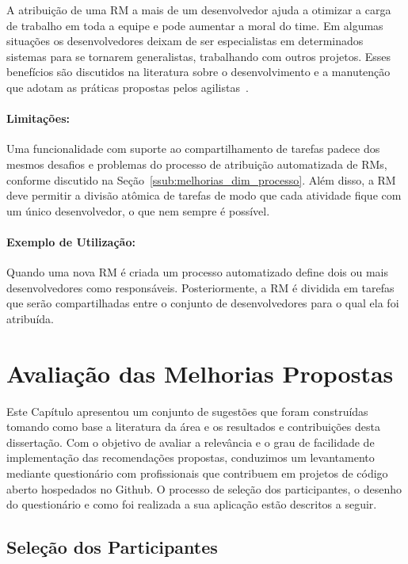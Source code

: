 A atribuição de uma RM a mais de um desenvolvedor ajuda a otimizar a carga de
trabalho em toda a equipe e pode aumentar a moral do time. Em algumas situações
os desenvolvedores deixam de ser especialistas em determinados sistemas para se
tornarem generalistas, trabalhando com outros projetos. Esses benefícios são
discutidos na literatura sobre o desenvolvimento e a manutenção que adotam as
práticas propostas pelos agilistas~\cite{dybaa2008empirical,rudzki2009agile}.

\paragraph{Limitações:}
\label{par:limitacoes_s08}

Uma funcionalidade com suporte ao compartilhamento de tarefas padece dos mesmos
desafios e problemas do processo de atribuição automatizada de RMs, conforme
discutido na Seção~\ref{ssub:melhorias_dim_processo}. Além disso, a RM deve
permitir a divisão atômica de tarefas de modo que cada atividade fique com um
único desenvolvedor, o que nem sempre é possível.

\paragraph{Exemplo de Utilização:}
\label{par:exemplo_de_utilização_s08}

Quando uma nova RM é criada um processo automatizado define dois ou mais
desenvolvedores como responsáveis. Posteriormente, a RM é dividida em tarefas
que serão compartilhadas entre o conjunto de desenvolvedores para o qual ela foi
atribuída.

\section{Avaliação das Melhorias Propostas}
\label{sec:sug_melhoria_avaliacao_das_melhorias}

Este Capítulo apresentou um conjunto de sugestões que foram construídas tomando
como base a literatura da área e os resultados e contribuições desta
dissertação. Com o objetivo de avaliar a relevância e o grau de facilidade de
implementação das recomendações propostas, conduzimos um levantamento mediante
questionário com profissionais que contribuem em projetos de código aberto
hospedados no Github. O processo de seleção dos participantes, o desenho do
questionário e como foi realizada a sua aplicação estão descritos a seguir.

\subsection{Seleção dos Participantes}
\label{ssub:sug_melhoria_selecao_participantes}

